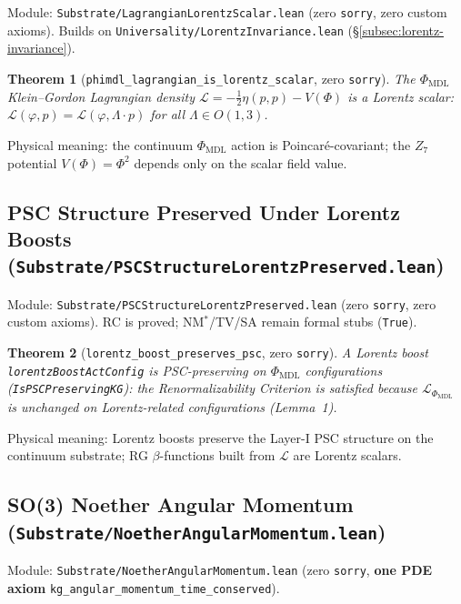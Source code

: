\documentclass[11pt,a4paper]{article}
\newtheorem{theorem}{Theorem}[section]
\theoremstyle{definition}
\begin{document}
Module: \texttt{Substrate/LagrangianLorentzScalar.lean} (zero
\lstinline|sorry|, zero custom axioms).
Builds on \texttt{Universality/LorentzInvariance.lean}
(\S\ref{subsec:lorentz-invariance}).

\begin{theorem}[\lstinline|phimdl_lagrangian_is_lorentz_scalar|, zero \texttt{sorry}]
The $\Phi_{\mathrm{MDL}}$ Klein--Gordon Lagrangian density
$\mathcal{L} = -\tfrac{1}{2}\eta(p,p) - V(\Phi)$ is a Lorentz scalar:
$\mathcal{L}(\varphi,p) = \mathcal{L}(\varphi, \Lambda\cdot p)$ for all
$\Lambda \in O(1,3)$.
\end{theorem}

Physical meaning: the continuum $\Phi_{\mathrm{MDL}}$ action is
Poincar\'e-covariant; the $Z_7$ potential $V(\Phi)=\Phi^2$ depends only on
the scalar field value.

\subsection{PSC Structure Preserved Under Lorentz Boosts
  (\texttt{Substrate/PSCStructureLorentzPreserved.lean})}\label{subsec:psc-structure-lorentz}

Module: \texttt{Substrate/PSCStructureLorentzPreserved.lean} (zero
\lstinline|sorry|, zero custom axioms).
RC is proved; NM$^*$/TV/SA remain formal stubs (\texttt{True}).

\begin{theorem}[\lstinline|lorentz_boost_preserves_psc|, zero \texttt{sorry}]
A Lorentz boost \lstinline|lorentzBoostActConfig| is PSC-preserving on
$\Phi_{\mathrm{MDL}}$ configurations (\lstinline|IsPSCPreservingKG|):
the Renormalizability Criterion is satisfied because $\mathcal{L}_{\Phi_{\mathrm{MDL}}}$
is unchanged on Lorentz-related configurations (Lemma~1).
\end{theorem}

Physical meaning: Lorentz boosts preserve the Layer-I PSC structure on the
continuum substrate; RG $\beta$-functions built from $\mathcal{L}$ are Lorentz scalars.

\subsection[SO(3) Noether Angular Momentum (\texttt{NoetherAngularMomentum.lean})]{SO(3) Noether Angular Momentum
  (\texttt{Substrate/\allowbreak NoetherAngularMomentum.lean})}\label{subsec:noether-angular-momentum}

Module: \texttt{Substrate/NoetherAngularMomentum.lean} (zero
\lstinline|sorry|, \textbf{one PDE axiom}
\lstinline|kg_angular_momentum_time_conserved|).
\end{document}
